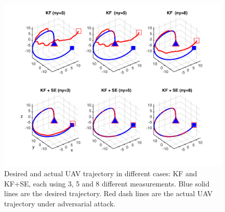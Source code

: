 \documentclass[../../thesis.tex]{subfiles}
\begin{document}
\begin{figure}
\center
\includegraphics[width=\textwidth]{chapters/se_linear/figures/qh/uav_lqg_traj}
\caption{Desired and actual UAV trajectory in different cases: KF and KF+SE, each using 3, 5 and 8 different measurements. Blue solid lines are the desired trajectory. Red dash lines are the actual UAV trajectory under adversarial attack.}
\label{fig:ex_uav_traj}
\end{figure}
\end{document}
